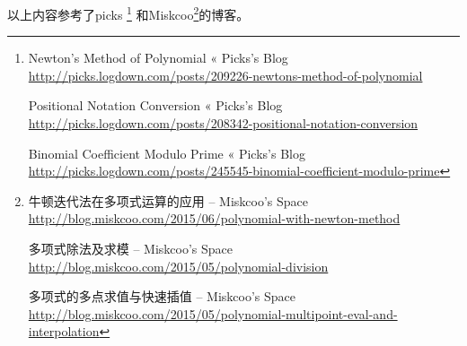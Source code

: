 以上内容参考了picks
\footnote{
Newton's Method of Polynomial « Picks's Blog
\\\url{http://picks.logdown.com/posts/209226-newtons-method-of-polynomial}

Positional Notation Conversion « Picks's Blog
\\\url{http://picks.logdown.com/posts/208342-positional-notation-conversion}

Binomial Coefficient Modulo Prime « Picks's Blog
\\\url{http://picks.logdown.com/posts/245545-binomial-coefficient-modulo-prime}

}
和Miskcoo\footnote{
牛顿迭代法在多项式运算的应用 – Miskcoo's Space
\\\url{http://blog.miskcoo.com/2015/06/polynomial-with-newton-method}

多项式除法及求模 – Miskcoo's Space
\\\url{http://blog.miskcoo.com/2015/05/polynomial-division}

多项式的多点求值与快速插值 – Miskcoo's Space
\\\url{http://blog.miskcoo.com/2015/05/polynomial-multipoint-eval-and-interpolation}
}的博客。
